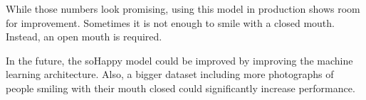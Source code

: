 While those numbers look promising, using this model in production shows
room for improvement. Sometimes it is not enough to smile with a closed
mouth. Instead, an open mouth is required.

In the future, the soHappy model could be improved by improving the machine 
learning architecture. Also, a bigger dataset including more photographs of
people smiling with their mouth closed could significantly increase 
performance.
